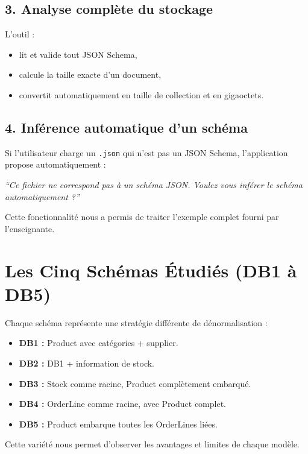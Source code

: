 \documentclass[12pt,a4paper]{article}
\begin{document}
\subsection{3. Analyse complète du stockage}

L’outil :
\begin{itemize}
    \item lit et valide tout JSON Schema,
    \item calcule la taille exacte d’un document,
    \item convertit automatiquement en taille de collection et en gigaoctets.
\end{itemize}

\subsection{4. Inférence automatique d’un schéma}

Si l'utilisateur charge un \texttt{.json} qui n’est pas un JSON Schema,  
l’application propose automatiquement :

\begin{center}
\textit{``Ce fichier ne correspond pas à un schéma JSON. Voulez   vous inférer le schéma automatiquement ?''}
\end{center}

Cette fonctionnalité nous a permis de traiter l'exemple complet fourni par l’enseignante.

\section{Les Cinq Schémas Étudiés (DB1 à DB5)}

Chaque schéma représente une stratégie différente de dénormalisation :

\begin{itemize}
    \item \textbf{DB1 :} Product avec catégories + supplier.
    \item \textbf{DB2 :} DB1 + information de stock.
    \item \textbf{DB3 :} Stock comme racine, Product complètement embarqué.
    \item \textbf{DB4 :} OrderLine comme racine, avec Product complet.
    \item \textbf{DB5 :} Product embarque toutes les OrderLines liées.
\end{itemize}

Cette variété nous permet d'observer les avantages et limites de chaque modèle.
\end{document}
